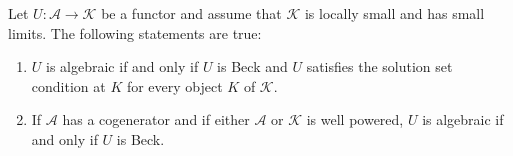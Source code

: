 Let $U: \mathcal{A} \longrightarrow \mathcal{K}$ be a functor and assume that $\mathcal{K}$ is locally small and has small limits. The following statements are true:

\begin{enumerate}
\item $U$ is algebraic if and only if $U$ is Beck and $U$ satisfies the solution set condition at $K$ for every object $K$ of $\mathcal{K}$.
\item If $\mathcal{A}$ has a cogenerator and if either $\mathcal{A}$ or $\mathcal{K}$ is well powered, $U$ is algebraic if and only if $U$ is Beck.
\end{enumerate}
